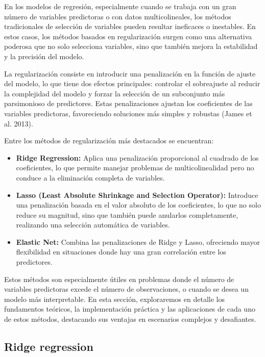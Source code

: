 \documentclass[
  letterpaper,
  DIV=11,
  numbers=noendperiod]{scrreprt}
\providecommand{\tightlist}{%
  \setlength{\itemsep}{0pt}\setlength{\parskip}{0pt}}
\begin{document}
En los modelos de regresión, especialmente cuando se trabaja con un gran
número de variables predictoras o con datos multicolineales, los métodos
tradicionales de selección de variables pueden resultar ineficaces o
inestables. En estos casos, los métodos basados en regularización surgen
como una alternativa poderosa que no solo selecciona variables, sino que
también mejora la estabilidad y la precisión del modelo.

La regularización consiste en introducir una penalización en la función
de ajuste del modelo, lo que tiene dos efectos principales: controlar el
sobreajuste al reducir la complejidad del modelo y forzar la selección
de un subconjunto más parsimonioso de predictores. Estas penalizaciones
ajustan los coeficientes de las variables predictoras, favoreciendo
soluciones más simples y robustas (James et al. 2013).

Entre los métodos de regularización más destacados se encuentran:

\begin{itemize}
\tightlist
\item
  \textbf{Ridge Regression:} Aplica una penalización proporcional al
  cuadrado de los coeficientes, lo que permite manejar problemas de
  multicolinealidad pero no conduce a la eliminación completa de
  variables.
\item
  \textbf{Lasso (Least Absolute Shrinkage and Selection Operator):}
  Introduce una penalización basada en el valor absoluto de los
  coeficientes, lo que no solo reduce su magnitud, sino que también
  puede anularlos completamente, realizando una selección automática de
  variables.
\item
  \textbf{Elastic Net:} Combina las penalizaciones de Ridge y Lasso,
  ofreciendo mayor flexibilidad en situaciones donde hay una gran
  correlación entre los predictores.
\end{itemize}

Estos métodos son especialmente útiles en problemas donde el número de
variables predictoras excede el número de observaciones, o cuando se
desea un modelo más interpretable. En esta sección, exploraremos en
detalle los fundamentos teóricos, la implementación práctica y las
aplicaciones de cada uno de estos métodos, destacando sus ventajas en
escenarios complejos y desafiantes.

\subsection{Ridge regression}\label{ridge-regression}
\end{document}
